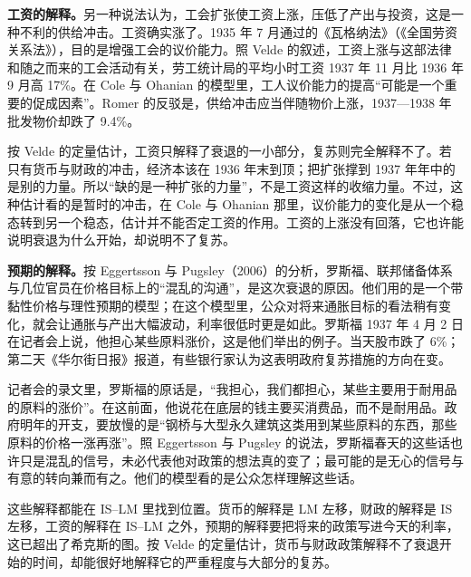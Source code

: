 \textbf{工资的解释。}另一种说法认为，工会扩张使工资上涨，压低了产出与投资，这是一种不利的供给冲击\cite{romer1992}。工资确实涨了。1935 年 7 月通过的《瓦格纳法》（《全国劳资关系法》），目的是增强工会的议价能力\cite{velde2009}。照 Velde 的叙述，工资上涨与这部法律和随之而来的工会活动有关，劳工统计局的平均小时工资 1937 年 11 月比 1936 年 9 月高 17\%\cite{velde2009}。在 Cole 与 Ohanian 的模型里，工人议价能力的提高“可能是一个重要的促成因素”\cite{velde2009}。Romer 的反驳是，供给冲击应当伴随物价上涨，1937—1938 年批发物价却跌了 9.4\%\cite{romer1992}。

按 Velde 的定量估计，工资只解释了衰退的一小部分，复苏则完全解释不了\cite{velde2009}。若只有货币与财政的冲击，经济本该在 1936 年末到顶；把扩张撑到 1937 年年中的是别的力量。所以“缺的是一种扩张的力量”，不是工资这样的收缩力量\cite{velde2009}。不过，这种估计看的是暂时的冲击，在 Cole 与 Ohanian 那里，议价能力的变化是从一个稳态转到另一个稳态，估计并不能否定工资的作用\cite{velde2009}。工资的上涨没有回落，它也许能说明衰退为什么开始，却说明不了复苏\cite{velde2009}。

\textbf{预期的解释。}按 Eggertsson 与 Pugsley（2006）的分析，罗斯福、联邦储备体系与几位官员在价格目标上的“混乱的沟通”，是这次衰退的原因\cite{eggertsson2006}。他们用的是一个带黏性价格与理性预期的模型；在这个模型里，公众对将来通胀目标的看法稍有变化，就会让通胀与产出大幅波动，利率很低时更是如此\cite{eggertsson2006}。罗斯福 1937 年 4 月 2 日在记者会上说，他担心某些原料涨价，这是他们举出的例子。当天股市跌了 6\%；第二天《华尔街日报》报道，有些银行家认为这表明政府复苏措施的方向在变\cite{eggertsson2006}。

记者会的录文里，罗斯福的原话是，“我担心，我们都担心，某些主要用于耐用品的原料的涨价”\cite{app1937}。在这前面，他说花在底层的钱主要买消费品，而不是耐用品\cite{app1937}。政府明年的开支，要放慢的是“钢桥与大型永久建筑这类用到某些原料的东西，那些原料的价格一涨再涨”\cite{app1937}。照 Eggertsson 与 Pugsley 的说法，罗斯福春天的这些话也许只是混乱的信号，未必代表他对政策的想法真的变了；最可能的是无心的信号与有意的转向兼而有之\cite{eggertsson2006}。他们的模型看的是公众怎样理解这些话。

这些解释都能在 IS–LM 里找到位置。货币的解释是 LM 左移，财政的解释是 IS 左移，工资的解释在 IS–LM 之外，预期的解释要把将来的政策写进今天的利率，这已超出了希克斯的图。按 Velde 的定量估计，货币与财政政策解释不了衰退开始的时间，却能很好地解释它的严重程度与大部分的复苏\cite{velde2009}。

